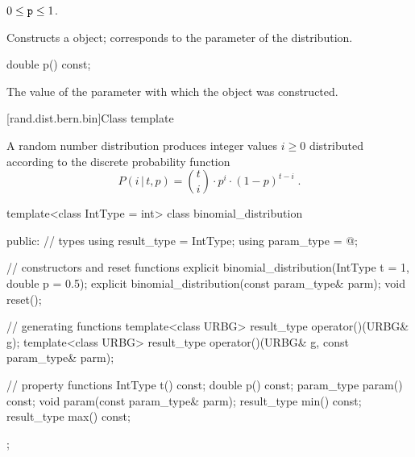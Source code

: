 \begin{itemdescr}
\pnum\requires
 $0 \leq \texttt{p} \leq 1$.

\pnum\effects Constructs a  object;
 corresponds to the parameter of the distribution.
\end{itemdescr}

%
\begin{itemdecl}
double p() const;
\end{itemdecl}

\begin{itemdescr}
\pnum\returns The value of the  parameter
 with which the object was constructed.
\end{itemdescr}


[rand.dist.bern.bin]{Class template }%
%
%

\pnum
A  random number distribution
produces integer values $i \geq 0$
distributed according to
the discrete probability function%
%
%
\[%
 P(i\,|\,t,p)
      = \binom{t}{i} \cdot p^i \cdot (1-p)^{t-i}
\; \mbox{.}
\]

%
\begin{codeblock}
template<class IntType = int>
 class binomial_distribution
{
public:
 // types
 using result_type = IntType;
 using param_type  = @\unspec@;

 // constructors and reset functions
 explicit binomial_distribution(IntType t = 1, double p = 0.5);
 explicit binomial_distribution(const param_type& parm);
 void reset();

 // generating functions
 template<class URBG>
   result_type operator()(URBG& g);
 template<class URBG>
   result_type operator()(URBG& g, const param_type& parm);

 // property functions
 IntType t() const;
 double p() const;
 param_type param() const;
 void param(const param_type& parm);
 result_type min() const;
 result_type max() const;
};
\end{codeblock}


